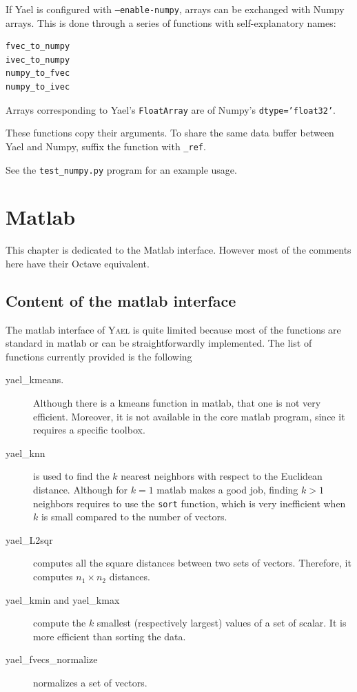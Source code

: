 \documentclass[a4paper,11pt,notitlepage,final,twoside]{report}
\newcommand{\yael}{\textsc{Yael}\xspace}
\newcommand{\tc}[1]{\texttt{#1}}
\begin{document}
If Yael is configured with \tc{--enable-numpy}, arrays can be
exchanged with Numpy arrays. This is done through a series of functions with self-explanatory names: 

\begin{verbatim}
fvec_to_numpy 
ivec_to_numpy 
numpy_to_fvec 
numpy_to_ivec 
\end{verbatim}

Arrays corresponding to Yael's \tc{FloatArray} are of Numpy's \tc{dtype='float32'}.  

These functions copy their arguments. To share the same data buffer between Yael and Numpy, suffix the function with \tc{\_ref}. 

See the \tc{test\_numpy.py} program for an example usage. 

\chapter{Matlab}

This chapter is dedicated to the Matlab interface. 
However most of the comments here have their Octave equivalent. 

\section{Content of the matlab interface}

The matlab interface of \yael is quite limited because most 
of the functions are standard in matlab or can be straightforwardly 
implemented. 
The list of functions currently provided is the following
\begin{description}
\item  [yael\_kmeans.] Although there is a kmeans function in matlab, 
that one is not very efficient. Moreover, it is not available in 
the core matlab program, since it requires a specific toolbox. 
\item [yael\_knn] is used to find the $k$ nearest neighbors with respect 
to the Euclidean distance. Although for $k=1$ matlab makes a good job, 
finding $k>1$ neighbors requires to use the \tc{sort} 
function, which is very inefficient when $k$ is small compared to the number 
of vectors. 
\item [yael\_L2sqr] computes all the square distances between two sets of vectors. 
Therefore, it computes $n_1\times n_2$ distances. 
\item [yael\_kmin and yael\_kmax] compute the $k$ smallest (respectively largest) 
values of a set of scalar. It is more efficient than sorting the data. 
\item [yael\_fvecs\_normalize] normalizes a set of vectors. 


\end{description}
\end{document}
